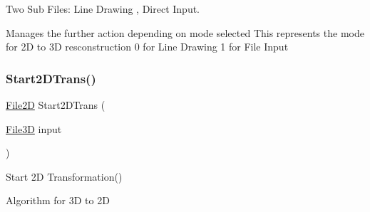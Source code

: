 Two Sub Files\+: Line Drawing , Direct Input. 

Manages the further action depending on mode selected This represents the mode for 2D to 3D resconstruction 0 for Line Drawing 1 for File Input \mbox{\label{group___module1_ga00ce237c3b5588e4f0cb10e3814d3464}} 
\subsubsection{\texorpdfstring{Start2\+D\+Trans()}{Start2DTrans()}}
{\footnotesize\ttfamily \mbox{\hyperlink{class_file2_d}{File2D}} Start2\+D\+Trans (\begin{DoxyParamCaption}\item[{\mbox{\hyperlink{class_file3_d}{File3D}}}]{input }\end{DoxyParamCaption})}



Start 2D Transformation() 

Algorithm for 3D to 2D 